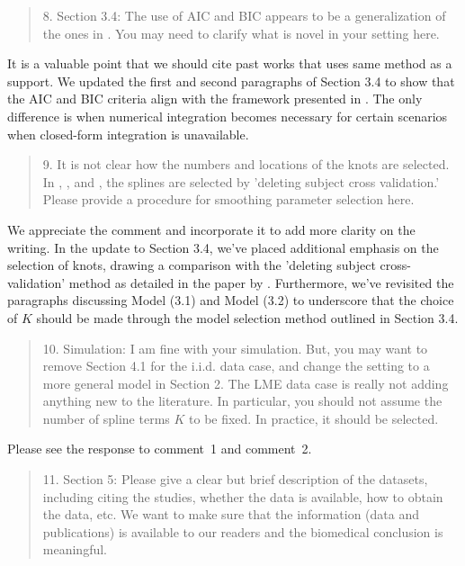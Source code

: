 \documentclass[12pt]{article}
\newenvironment{comment}%
{\begin{quotation}\noindent\small\it\ignorespaces%
  }{\end{quotation}}
\begin{document}
\begin{comment}
  8. Section 3.4: The use of AIC and BIC appears to be a
  generalization of the ones in \cite{rice2001nonparametric}. You
  may need to clarify what is novel in your setting here.
\end{comment}

It is a valuable point that we should cite past works that uses same
method as a support. We updated the first and second paragraphs of
Section 3.4 to show that the AIC and BIC criteria align with the
framework presented in \cite{rice2001nonparametric}. The only
difference is when numerical integration becomes necessary for certain
scenarios when closed-form integration is unavailable.


\begin{comment}
  9. It is not clear how the numbers and locations of the knots are
  selected. In \cite{rice2001nonparametric}, \cite{huang2002varying},
  and \cite{wu2018nonparametric}, the splines are selected by
  'deleting subject cross validation.' Please provide a procedure for
  smoothing parameter selection here.
\end{comment}

We appreciate the comment and incorporate it to add more clarity on
the writing. In the update to Section 3.4, we've placed
additional emphasis on the selection of knots, drawing a
comparison with the 'deleting subject cross-validation' method as
detailed in the paper by \cite{rice2001nonparametric}. Furthermore,
we've revisited the paragraphs discussing Model (3.1) and Model (3.2)
to underscore that the choice of $K$ should be made through the model
selection method outlined in Section 3.4.


\begin{comment}
  10. Simulation: I am fine with your simulation. But, you may want to
  remove Section 4.1 for the i.i.d. data case, and change the setting
  to a more general model in Section 2. The LME data case is really
  not adding anything new to the literature. In particular, you should
  not assume the number of spline terms $K$ to be fixed. In practice,
  it should be selected.
\end{comment}

Please see the response to comment~1 and comment~2.


\begin{comment}
  11. Section 5: Please give a clear but brief description of the
  datasets, including citing the studies, whether the data is
  available, how to obtain the data, etc. We want to make sure that
  the information (data and publications) is available to our readers
  and the biomedical conclusion is meaningful.
\end{comment}
\end{document}
